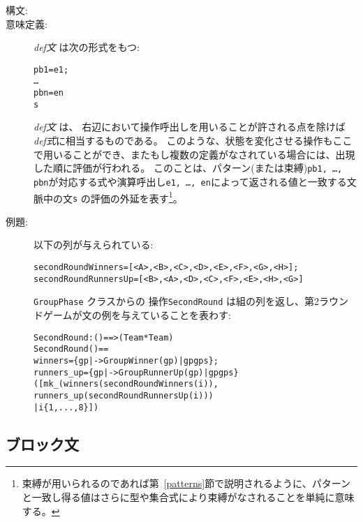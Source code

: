 \documentclass[\pformat,12pt]{jarticle}
\begin{document}
\begin{description}
\item[構文:]



\item[意味定義:] {\it def文} は次の形式をもつ:
  \begin{alltt}
     pb1 = e1;
        \ldots
        pbn = en
      s
  \end{alltt}
  {\it def文} は、 右辺において操作呼出しを用いることが許される点を除けば{\it def式}に相当するものである。 
このような、状態を変化させる操作もここで用いることができ、またもし複数の定義がなされている場合には、出現した順に評価が行われる。 
 このことは、パターン(または束縛){\tt pb1, \ldots, pbn}が対応する式や演算呼出し{\tt e1, \ldots, en}によって返される値と一致する文脈中の文{\tt s} の評価の外延を表す\footnote{束縛が用いられるのであれば第~\ref{patterns}節で説明されるように、パターンと一致し得る値はさらに型や集合式により束縛がなされることを単純に意味する。}。

\item[例題:]  以下の列が与えられている:
  \begin{alltt}
  secondRoundWinners = [<A>,<B>,<C>,<D>,<E>,<F>,<G>,<H>];
  secondRoundRunnersUp = [<B>,<A>,<D>,<C>,<F>,<E>,<H>,<G>]
  \end{alltt}
 \texttt{GroupPhase} クラスからの
操作\texttt{SecondRound}%
は組の列を返し、第2ラウンドゲームが文の例を与えていることを表わす:
  \begin{alltt}
  SecondRound : () ==>  (Team * Team)
  SecondRound () ==
   winners = \{ gp |-> GroupWinner(gp) | gp  gps \};
     runners_up = \{ gp |-> GroupRunnerUp(gp) | gp  gps\}
   ([mk_(winners(secondRoundWinners(i)),
                runners_up(secondRoundRunnersUp(i))) 
           | i  \{1,...,8\}])
  \end{alltt}

\end{description}

\subsection{ブロック文} \label{dcl-stmt}
\end{document}
